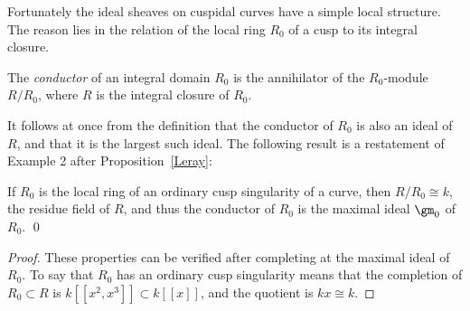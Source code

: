 %

Fortunately the ideal sheaves on cuspidal curves have a simple local structure. The reason lies in the relation of the local ring $R_{0}$ of a cusp to its integral closure. 

\begin{definition}
The \emph{conductor} of an integral domain $R_{0}$ is the annihilator of the $R_{0}$-module
$R/R_{0}$, where $R$ is the integral closure of $R_{0}$.
\end{definition}

It follows at once from the definition that the conductor of $R_{0}$ is also an ideal of $R$, and that it is the largest such ideal. The following result is a restatement of Example 2 after Proposition~\ref{Leray}:

\begin{proposition}\label{conductor of node and cusp}
If $R_{0}$ is the local ring of an ordinary cusp singularity of a curve, then  $R/R_{0} \cong k$, the residue field of $R$, and thus the conductor of $R_{0}$ is the
maximal ideal $\gm_{0}$ of $R_{0}$. \qed
\end{proposition}

\begin{proof} These properties can be verified after completing at the maximal ideal of $R_{0}$.
To say 
%
that $R_0$ has an ordinary cusp singularity means that the completion of 
$R_0 \subset R$ is $k[[x^2,x^3]]\subset k[[x]]$, and the quotient is $kx \cong k$.
\end{proof}

